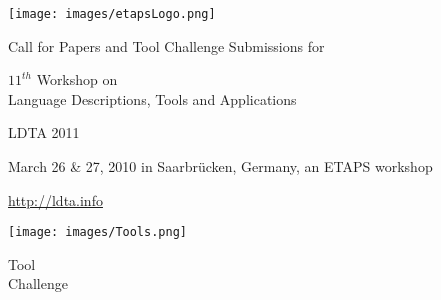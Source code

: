 \documentclass[10pt,A4paper]{article}
\begin{document}
\noindent
\begin{minipage}[b][1.6in][t]{1in}
\texttt{[image: images/etapsLogo.png]}

\end{minipage}
\begin{minipage}[b][1.6in][t]{5in}
\begin{center}
Call for Papers and Tool Challenge Submissions for

\vspace{2mm}

{\Large $11^{th}$ Workshop on \\
Language Descriptions, Tools and Applications}

\vspace{3mm}

{\Large LDTA 2011}

\vspace{3mm}

March 26 \& 27, 2010 in Saarbr\"ucken, Germany, an ETAPS workshop

\vspace{2mm}

\url{http://ldta.info}
\end{center}
\end{minipage}
\begin{minipage}[b][1.6in][t]{1in}
\texttt{[image: images/Tools.png]}
\vspace{-8mm}
\begin{center}
Tool \\
Challenge
\end{center}
\end{minipage}

\newcommand{\pcmem}[3]{#1}%
\newcommand{\pcchair}[4]{#1, (co-chair)\\ #4}
\end{document}
